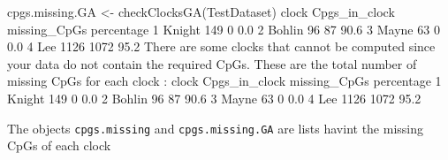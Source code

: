 \documentclass[]{article}
\newcommand{\hlnum}[1]{\textcolor[rgb]{0.816,0.125,0.439}{#1}}%
\newcommand{\hlstr}[1]{\textcolor[rgb]{0.251,0.627,0.251}{#1}}%
\newcommand{\hlopt}[1]{\textcolor[rgb]{0,0,0}{#1}}%
\newcommand{\hlstd}[1]{\textcolor[rgb]{0.251,0.251,0.251}{#1}}%
\newcommand{\hlkwd}[1]{\textcolor[rgb]{0.878,0.439,0.125}{#1}}%
\newenvironment{Shaded}{\begin{myshaded}}{\end{myshaded}}
\newcommand{\KeywordTok}[1]{\hlkwd{#1}}
\newcommand{\DecValTok}[1]{\hlnum{#1}}
\newcommand{\FloatTok}[1]{\hlnum{#1}}
\newcommand{\StringTok}[1]{\hlstr{#1}}
\newcommand{\ControlFlowTok}[1]{\hlkwd{#1}}
\newcommand{\OperatorTok}[1]{\hlopt{#1}}
\newcommand{\NormalTok}[1]{\hlstd{#1}}
\begin{document}
\begin{Shaded}
\begin{Highlighting}[]
\NormalTok{cpgs.missing.GA <-}\StringTok{ }\KeywordTok{checkClocksGA}\NormalTok{(TestDataset)}
\NormalTok{     clock Cpgs_in_clock missing_CpGs percentage}
  \DecValTok{1}\NormalTok{ Knight           }\DecValTok{149}            \DecValTok{0}        \FloatTok{0.0}
  \DecValTok{2}\NormalTok{ Bohlin            }\DecValTok{96}           \DecValTok{87}       \FloatTok{90.6}
  \DecValTok{3}\NormalTok{  Mayne            }\DecValTok{63}            \DecValTok{0}        \FloatTok{0.0}
  \DecValTok{4}\NormalTok{    Lee          }\DecValTok{1126}         \DecValTok{1072}       \FloatTok{95.2}
\NormalTok{  There are some clocks that cannot be computed since your data do not contain the required CpGs. }
\NormalTok{          These are the total number of missing CpGs }\ControlFlowTok{for}\NormalTok{ each clock }\OperatorTok{:}\StringTok{ }
\StringTok{   }
\StringTok{     }\NormalTok{clock Cpgs_in_clock missing_CpGs percentage}
  \DecValTok{1}\NormalTok{ Knight           }\DecValTok{149}            \DecValTok{0}        \FloatTok{0.0}
  \DecValTok{2}\NormalTok{ Bohlin            }\DecValTok{96}           \DecValTok{87}       \FloatTok{90.6}
  \DecValTok{3}\NormalTok{  Mayne            }\DecValTok{63}            \DecValTok{0}        \FloatTok{0.0}
  \DecValTok{4}\NormalTok{    Lee          }\DecValTok{1126}         \DecValTok{1072}       \FloatTok{95.2}
\end{Highlighting}
\end{Shaded}

The objects \texttt{cpgs.missing} and \texttt{cpgs.missing.GA} are lists havint the missing CpGs of each clock
\end{document}
